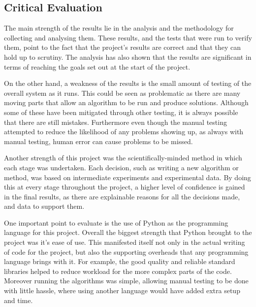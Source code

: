 \documentclass[12pt]{report}
\begin{document}
\subsection{Critical Evaluation}\label{Eval}
The main strength of the results lie in the analysis and the methodology for collecting and analysing them. These results, and the tests that were run to verify them, point to the fact that the project's results are correct and that they can hold up to scrutiny. The analysis has also shown that the results are significant in terms of reaching the goals set out at the start of the project. 

On the other hand, a weakness of the results is the small amount of testing of the overall system as it runs. This could be seen as problematic as there are many moving parts that allow an algorithm to be run and produce solutions. Although some of these have been mitigated through other testing, it is always possible that there are still mistakes. Furthermore even though the manual testing attempted to reduce the likelihood of any problems showing up, as always with manual testing, human error can cause problems to be missed.

Another strength of this project was the scientifically-minded method in which each stage was undertaken. Each decision, such as writing a new algorithm or method, was based on intermediate experiments and experimental data. By doing this at every stage throughout the project, a higher level of confidence is gained in the final results, as there are explainable reasons for all the decisions made, and data to support them.

One important point to evaluate is the use of Python as the programming language for this project. Overall the biggest strength that Python brought to the project was it's ease of use. This manifested itself not only in the actual writing of code for the project, but also the supporting overheads that any programming language brings with it. For example, the good quality and reliable standard libraries helped to reduce workload for the more complex parts of the code. Moreover running the algorithms was simple, allowing manual testing to be done with little hassle, where using another language would have added extra setup and time. 
\end{document}
